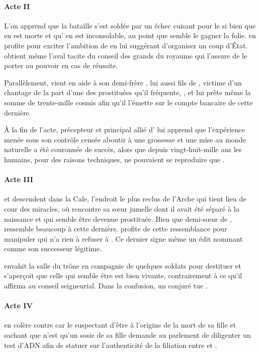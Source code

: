 \paragraph{Acte II}
L’on apprend que la bataille s’est soldée par un échec cuisant pour le \campprincipal{} si bien que \princesse{} en est morte et qu’\roi{} en est inconsolable, au point que semble le gagner la folie. \elena{} en profite pour exciter l’ambition de \general{} en lui suggérant d’organiser un coup d’État. \general{} obtient même l’aval tacite du conseil des grands du royaume qui l’assure de le porter au pouvoir en cas de réussite.

Parallèlement, \elena{} vient en aide à son demi-frère \vladimir{}, lui aussi fils de \reine{}, victime d’un chantage de la part d’une des prostituées qu’il fréquente, \catin, et lui prête même la somme de trente-mille cosmis afin qu’il l’émette sur le compte bancaire de cette dernière.

À la fin de l’acte, \alexas{} précepteur et principal allié d’\elena{} lui apprend que l’expérience menée sous son contrôle censée aboutir à une grossesse et une mise au monde naturelle a été couronnée de succès, alors que depuis vingt-huit-mille ans les humains, pour des raisons techniques, ne pouvaient se reproduire que .


\paragraph{Acte III}
\elena{} et \alexas{} descendent dans la Cale, l’endroit le plus reclus de l’Arche qui tient lieu de cour des miracles, où \elena{} rencontre \ela{} sa sœur jumelle dont il avait été séparé à la naissance et qui semble être devenue prostituée. Bien que demi-sœur de \princesse{}, \ela{} ressemble beaucoup à cette dernière. \elena{} profite de cette ressemblance pour manipuler \roi{} qui n’a rien à refuser à \ela{}. Ce dernier signe même un édit nommant \elena{} comme son successeur légitime.

\general{} envahit la salle du trône en compagnie de quelques soldats pour destituer \roi{} et s’aperçoit que celle qui semble être \princesse{} est bien vivante, contrairement à ce qu’il affirma au conseil seigneurial. Dans la confusion, un conjuré tue \general{}.

\paragraph{Acte IV}
\reine{} en colère contre \elena{} car le suspectant d’être à l’origine de la mort de sa fille et sachant que \ela{} n’est qu’un sosie de sa fille \princesse{} demande au parlement de diligenter un test d’ADN afin de statuer sur l’authenticité de la filiation entre \roi{} et \ela{}.

